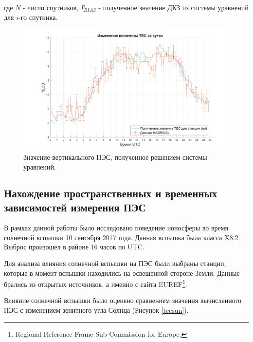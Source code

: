 \documentclass[a4paper]{article}
\begin{document}
где $N$ - число спутников, $I_{BIAS}^i$ - полученное значение ДКЗ из системы уравнений для $i$-го спутника.

\begin{landscape}
\begin{figure}[h!]
\centering
\includegraphics[width = 1\linewidth]{pics/clean_pics/tec_madrigal.png}
\caption{Значение вертикального ПЭС, полученное решением системы уравнений.}
\label{solvedtec}
\end{figure}
\end{landscape}

\clearpage
\newpage
\subsection{Нахождение пространственных и временных зависимостей измерения ПЭС}
В рамках данной работы было исследовано поведение ионосферы во время солнечной вспышки 10 сентября 2017 года. Данная вспышка была класса X8.2. Выброс произошел в районе 16 часов по UTC.

Для анализа влияния солнечной вспышки на ПЭС были выбраны станции, которые в момент вспышки находились на освещенной стороне Земли. Данные брались из открытых источников, а именно с сайта EUREF\footnote{Regional Reference Frame Sub-Commission for Europe.}.

Влияние солнечной вспышки было оценено сравнением значения вычисленного ПЭС с изменением зенитного угла Солнца (Рисунок \ref{tecsun}). 
\end{document}
